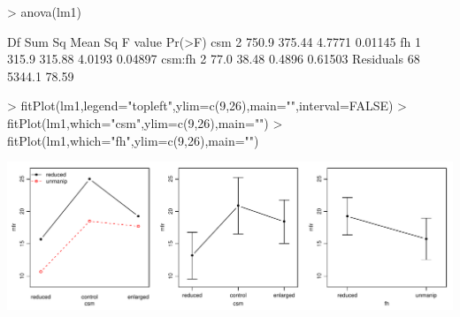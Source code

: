 \documentclass[a4paper]{article}
\begin{document}
\begin{Schunk}
\begin{Sinput}
> anova(lm1)
\end{Sinput}
\end{Schunk}
\begin{Schunk}
\begin{Soutput}
          Df Sum Sq Mean Sq F value  Pr(>F)
csm        2  750.9  375.44  4.7771 0.01145
fh         1  315.9  315.88  4.0193 0.04897
csm:fh     2   77.0   38.48  0.4896 0.61503
Residuals 68 5344.1   78.59                
\end{Soutput}
\end{Schunk}


\begin{Schunk}
\begin{Sinput}
> fitPlot(lm1,legend="topleft",ylim=c(9,26),main="",interval=FALSE)
> fitPlot(lm1,which="csm",ylim=c(9,26),main="")
> fitPlot(lm1,which="fh",ylim=c(9,26),main="")
\end{Sinput}
\end{Schunk}
\includegraphics[width=7in]{Figs/q2-untrFits.PDF}
\end{document}

